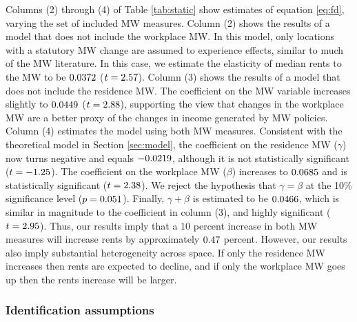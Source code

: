 Columns (2) through (4) of Table \ref{tab:static} show estimates of equation 
\eqref{eq:fd}, varying the set of included MW measures.
Column (2) shows the results of a model that does not include the workplace MW.
In this model, only locations with a statutory MW change are assumed to 
experience effects, similar to much of the MW literature.
In this case, we estimate the elasticity of median rents to the MW to be 
$0.0372$ ($t=2.57$).
Column (3) shows the results of a model that does not include the residence MW.
The coefficient on the MW variable increases slightly to 
$0.0449$ ($t=2.88$), 
supporting the view that changes in the workplace MW are a better proxy of 
the changes in income generated by MW policies.
Column (4) estimates the model using both MW measures.
Consistent with the theoretical model in Section \ref{sec:model}, the 
coefficient on the residence MW ($\gamma$) now turns negative and equals 
$-0.0219$, although it is not statistically significant 
($t=-1.25$).
The coefficient on the workplace MW ($\beta$) increases to $0.0685$ and 
is statistically significant ($t=2.38$).
We reject the hypothesis that $\gamma=\beta$ at the 10\% significance level 
($p = 0.051$).
Finally, $\gamma+\beta$ is estimated to be $0.0466$, which is similar 
in magnitude to the coefficient in column (3), and highly significant 
($t=2.95$).
Thus, our results imply that a 10 percent increase in both MW measures will 
increase rents by approximately $0.47$ percent.
However, our results also imply substantial heterogeneity across space.
If only the residence MW increases then rents are expected to decline,
and if only the workplace MW goes up then the rents increase will be larger.

\subsubsection*{Identification assumptions}

